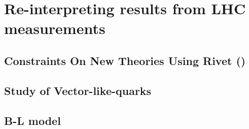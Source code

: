 \chapter{Re-interpreting results from LHC measurements}
\label{chap:reinterpretation}

\section{Constraints On New Theories Using Rivet (\contur)}
\label{sec:contur}

\section{Study of Vector-like-quarks}

\section{B-L model}

